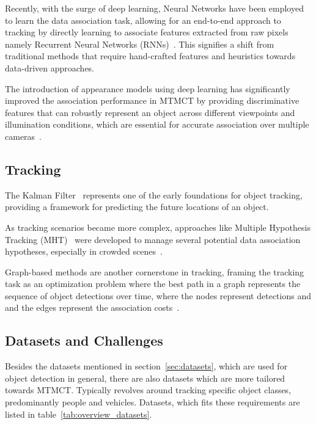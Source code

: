 Recently, with the surge of deep learning, Neural Networks have been employed to learn the data association task, allowing for an end-to-end approach to tracking by directly learning to associate features extracted from raw pixels namely Recurrent Neural Networks (RNNs)~\cite{Milan16b}. This signifies a shift from traditional methods that require hand-crafted features and heuristics towards data-driven approaches.

The introduction of appearance models using deep learning has significantly improved the association performance in MTMCT by providing discriminative features that can robustly represent an object across different viewpoints and illumination conditions, which are essential for accurate association over multiple cameras~\cite{Schroff15, Zheng16c}.

\subsection{Tracking}\label{subsec:milestone_tracking}
The Kalman Filter~\cite{Kalman60} represents one of the early foundations for object tracking, providing a framework for predicting the future locations of an object.

As tracking scenarios became more complex, approaches like Multiple Hypothesis Tracking (MHT)~\cite{Blackman04} were developed to manage several potential data association hypotheses, especially in crowded scenes~\cite{Reid79}.

Graph-based methods are another cornerstone in tracking, framing the tracking task as an optimization problem where the best path in a graph represents the sequence of object detections over time, where the nodes represent detections and and the edges represent the association costs~\cite{Zhang08}.

\subsection{Datasets and Challenges}\label{subsec:datasets_and_challenges}
Besides the datasets mentioned in section~\ref{sec:datasets}, which are used for object detection in general, there are also datasets which are more tailored towards MTMCT. Typically revolves around tracking specific object classes, predominantly people and vehicles. Datasets, which fits these requirements are listed in table~\ref{tab:overview_datasets}.

